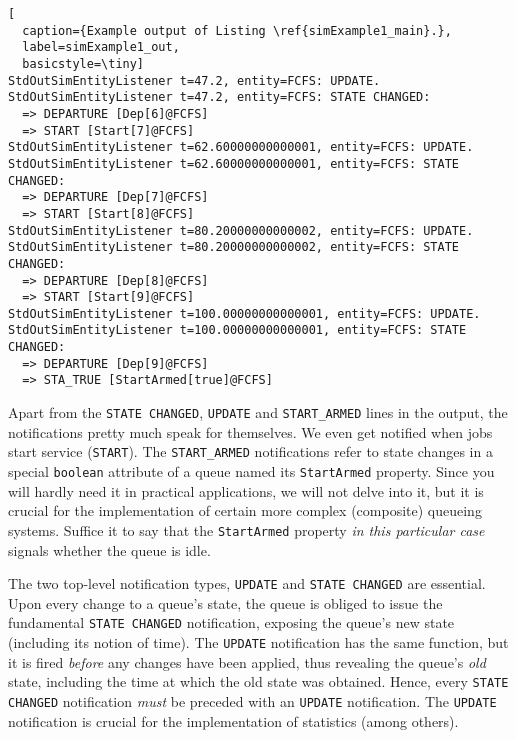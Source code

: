 \begin{lstfloat}
\begin{lstlisting}[
  caption={Example output of Listing \ref{simExample1_main}.},
  label=simExample1_out,
  basicstyle=\tiny]
StdOutSimEntityListener t=47.2, entity=FCFS: UPDATE.
StdOutSimEntityListener t=47.2, entity=FCFS: STATE CHANGED:
  => DEPARTURE [Dep[6]@FCFS]
  => START [Start[7]@FCFS]
StdOutSimEntityListener t=62.60000000000001, entity=FCFS: UPDATE.
StdOutSimEntityListener t=62.60000000000001, entity=FCFS: STATE CHANGED:
  => DEPARTURE [Dep[7]@FCFS]
  => START [Start[8]@FCFS]
StdOutSimEntityListener t=80.20000000000002, entity=FCFS: UPDATE.
StdOutSimEntityListener t=80.20000000000002, entity=FCFS: STATE CHANGED:
  => DEPARTURE [Dep[8]@FCFS]
  => START [Start[9]@FCFS]
StdOutSimEntityListener t=100.00000000000001, entity=FCFS: UPDATE.
StdOutSimEntityListener t=100.00000000000001, entity=FCFS: STATE CHANGED:
  => DEPARTURE [Dep[9]@FCFS]
  => STA_TRUE [StartArmed[true]@FCFS]

\end{lstlisting}
\end{lstfloat}

Apart from the \lstinline-STATE CHANGED-, \lstinline-UPDATE-
  and \lstinline-START_ARMED- lines in the output,
  the notifications pretty much speak for themselves.
We even get notified when jobs start service (\lstinline-START-).
The \lstinline-START_ARMED- notifications
  refer to state changes in a special \lstinline|boolean| attribute of a
  queue named its \lstinline-StartArmed- property.
Since you will hardly need it in practical applications,
  we will not delve into it,
  but it is crucial for the implementation
  of certain more complex (composite) queueing systems.
Suffice it to say that the \lstinline|StartArmed| property
  {\em in this particular case\/}
  signals whether the queue is idle.

The two top-level notification types,
  \lstinline|UPDATE| and \lstinline|STATE CHANGED|
  are essential.
Upon every change to a queue's state,
  the queue is obliged to issue the fundamental \lstinline|STATE CHANGED| notification,
  exposing the queue's new state (including its notion of time).
The \lstinline|UPDATE| notification
  has the same function,
  but it is fired {\em before\/} any changes have been applied,
  thus revealing the queue's {\em old\/} state,
  including the time at which the old state was obtained.
Hence,
  every \lstinline|STATE CHANGED| notification
  {\em must\/} be preceded with an
  \lstinline|UPDATE| notification.
The \lstinline|UPDATE| notification is
  crucial for the implementation of statistics
  (among others).
  
